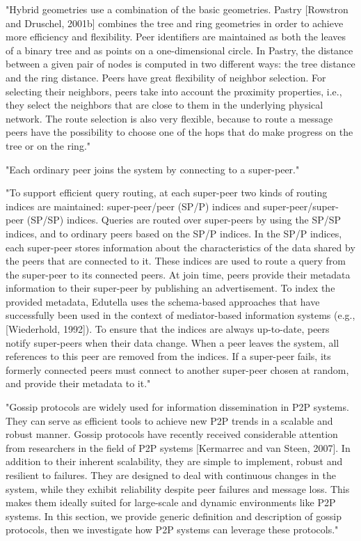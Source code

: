 "Hybrid geometries use a combination of the basic geometries. Pastry [Rowstron and Druschel, 2001b] combines the tree and ring geometries in order to achieve more efficiency and flexibility.
Peer identifiers are maintained as both the leaves of a binary tree and as points on a one-dimensional circle.
In Pastry, the distance between a given pair of nodes is computed in two different ways: the tree distance and the ring distance.
Peers have great flexibility of neighbor selection. For selecting their neighbors, peers take into account the proximity properties, i.e., they select the neighbors that are close to them in the underlying physical network.
The route selection is also very flexible, because to route a message peers have the possibility to choose one of the hops that do make progress on the tree or on the ring."\cite{book:p2p-mob}

"Each ordinary peer joins the system by connecting to a super-peer."\cite{book:p2p-mob}

"To support efficient query routing, at each super-peer two kinds of routing indices are maintained: super-peer/peer (SP/P) indices and super-peer/super-peer (SP/SP) indices.
Queries are routed over super-peers by using the SP/SP indices, and to ordinary peers based on the SP/P indices.
In the SP/P indices, each super-peer stores information about the characteristics of the data shared by the peers that are connected to it.
These indices are used to route a query from the super-peer to its connected peers.
At join time, peers provide their metadata information to their super-peer by publishing an advertisement.
To index the provided metadata, Edutella uses the schema-based approaches that have successfully been used in the context of mediator-based information systems (e.g., [Wiederhold, 1992]).
To ensure that the indices are always up-to-date, peers notify super-peers when their data change.
When a peer leaves the system, all references to this peer are removed from the indices.
If a super-peer fails, its formerly connected peers must connect to another super-peer chosen at random, and provide their metadata to it."\cite{book:p2p-mob}

"Gossip protocols are widely used for information dissemination in P2P systems.
They can serve as efficient tools to achieve new P2P trends in a scalable and robust manner.
Gossip protocols have recently received considerable attention from researchers in the field of P2P systems [Kermarrec and van Steen, 2007].
In addition to their inherent scalability, they are simple to implement, robust and resilient to failures.
They are designed to deal with continuous changes in the system, while they exhibit reliability despite peer failures and message loss.
This makes them ideally suited for large-scale and dynamic environments like P2P systems.
In this section, we provide generic definition and description of gossip protocols, then we investigate how P2P systems can leverage these protocols."\cite{book:p2p-mob}

